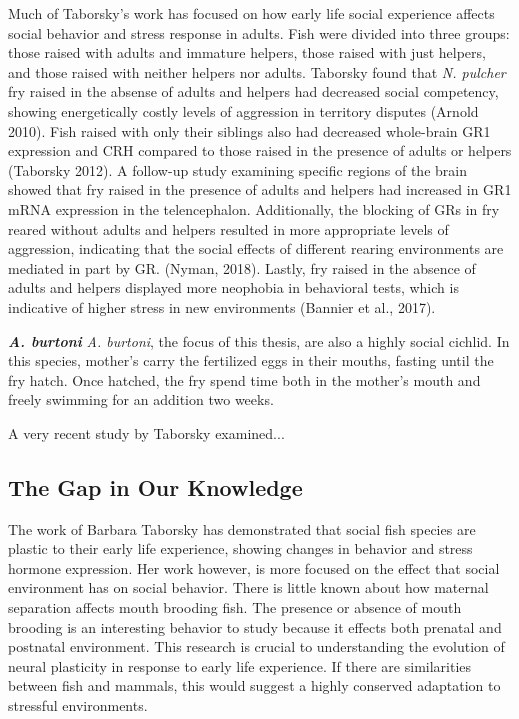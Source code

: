 \documentclass[12pt,twoside]{reedthesis}
\begin{document}
Much of Taborsky's work has focused on
how early life social experience affects social behavior and stress response in
adults. Fish were divided into three groups: those raised with adults and
immature helpers, those raised with just helpers, and those raised with neither
helpers nor adults. Taborsky found that \textit{N. pulcher} fry raised in the
absense of adults and helpers had decreased social competency, showing
energetically costly levels of aggression in territory disputes (Arnold 2010). Fish raised with only their siblings also had decreased whole-brain GR1
expression and CRH compared to those raised in the presence of adults or helpers
(Taborsky 2012). A follow-up study examining specific regions of the brain
showed that fry raised in the presence of adults and helpers had increased in
GR1 mRNA expression in the telencephalon. Additionally, the blocking of GRs in fry reared without adults and helpers resulted in more appropriate
levels of aggression, indicating that the social effects of different rearing
environments are mediated in part by GR. (Nyman, 2018). Lastly, fry raised in
the absence of adults and helpers displayed more neophobia in behavioral tests,
which is indicative of higher stress in new environments (Bannier et al., 2017). 


\textbf{\textit{A. burtoni}}
 \textit{A. burtoni}, the focus of this
thesis, are also a highly social cichlid. In this species, mother's carry the
fertilized eggs in their mouths, fasting until the fry hatch. Once hatched, the
fry spend time both in the mother's mouth and freely swimming for an addition
two weeks.    


A very recent study by Taborsky examined...
\subsection{The Gap in Our Knowledge}

The work of Barbara Taborsky has demonstrated that social fish species are
plastic to their early life experience, showing changes in behavior and stress
hormone expression. Her work however, is more focused on the effect that social
environment has on social behavior. There is little known about how maternal
separation affects mouth brooding fish. The presence or absence of mouth
brooding is an interesting behavior to study because it effects both prenatal
and postnatal environment. This research is crucial to
understanding the evolution of neural plasticity in response to early life
experience. If there are similarities between fish and mammals, this would
suggest a highly conserved adaptation to stressful environments.
\end{document}
